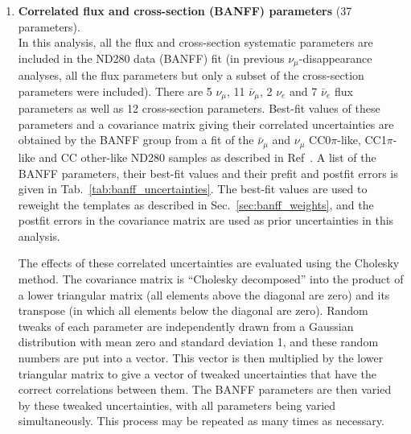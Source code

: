 \begin{enumerate}

\item 
{\bf Correlated flux and cross-section (BANFF) parameters} (37 parameters).\\

In this analysis, all the flux and cross-section systematic parameters are included in the ND280 data (BANFF) fit (in previous 
$\nu_{\mu}$-disappearance analyses, all the flux parameters but only a subset of the cross-section parameters were included).
There are 5 $\nu_{\mu}$, 11 $\bar{\nu}_{\mu}$, 2 $\nu_{e}$ and 7 $\bar{\nu}_{e}$ flux parameters as well as 12 cross-section parameters. 
Best-fit values of these parameters and a covariance matrix giving their correlated uncertainties are obtained by the BANFF group from a fit 
of the $\bar{\nu}_\mu$ and $\nu_\mu$ CC0$\pi$-like, CC1$\pi$-like and CC other-like ND280 samples as described in Ref~\cite{BANFF2015}. A list of the BANFF parameters, their best-fit values and their prefit and postfit errors is given in Tab.~\ref{tab:banff_uncertainties}. 
The best-fit values are used to reweight the templates as described in Sec.~\ref{sec:banff_weights}, and the postfit errors in the 
covariance matrix are used as prior uncertainties in this analysis. 

The effects of these correlated uncertainties are evaluated using the Cholesky method. The covariance matrix is ``Cholesky decomposed'' 
into the product of a lower triangular matrix (all elements above the diagonal are zero) and its transpose (in which all elements below the 
diagonal are zero). Random tweaks of each parameter are independently drawn from a Gaussian distribution with mean zero and standard deviation 1, 
and these random numbers are put into a vector. This vector is then multiplied by the lower triangular matrix to give a vector of tweaked 
uncertainties that have the correct correlations between them. The BANFF parameters are then varied by these tweaked uncertainties, with all 
parameters being varied simultaneously. This process may be repeated as many times as necessary. 


\end{enumerate}
